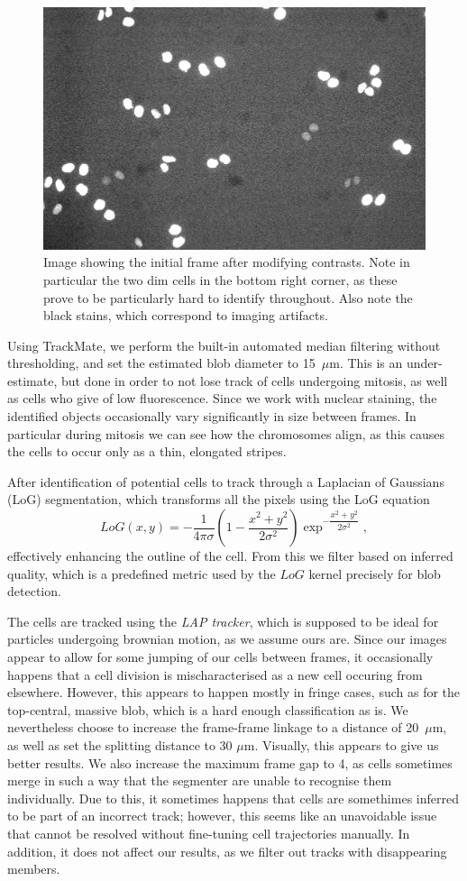 \documentclass[10pt]{article}
\theoremstyle{plain}
\begin{document}
\begin{multicols*}{2}
\begin{multicols}{2}
\begin{figure}[H]
  \centering
  \includegraphics[width=.5\textwidth]{../figures/contrast.png}
  \caption{Image showing the initial frame after modifying contrasts. Note in particular the two dim cells in the bottom right corner, as these prove to be particularly hard to identify throughout. Also note the black stains, which correspond to imaging artifacts.}
  \label{fig:contrasts}
\end{figure}

Using TrackMate, we perform the built-in automated median filtering without thresholding, and set the estimated blob diameter to 15~$\mu$m. This is an under-estimate, but done in order to not lose track of cells undergoing mitosis, as well as cells who give of low fluorescence. Since we work with nuclear staining, the identified objects occasionally vary significantly in size between frames. In particular during mitosis we can see how the chromosomes align, as this causes the cells to occur only as a thin, elongated stripes. 

After identification of potential cells to track through a Laplacian of Gaussians (LoG) segmentation, which transforms all the pixels using the LoG equation $$LoG(x,y) = - \dfrac{1}{4\pi\sigma}\left(1 - \dfrac{x^2 + y^2}{2\sigma^2}\right)\exp^{-\dfrac{x^2 + y^2}{2\sigma^2}},$$ effectively enhancing the outline of the cell. From this we filter based on inferred quality, which is a predefined metric used by the $LoG$ kernel precisely for blob detection.  

The cells are tracked using the \textit{LAP tracker}, which is supposed to be ideal for particles undergoing brownian motion, as we assume ours are. Since our images appear to allow for some jumping of our cells between frames, it occasionally happens that a cell division is mischaracterised as a new cell occuring from elsewhere. However, this appears to happen mostly in fringe cases, such as for the top-central, massive blob, which is a hard enough classification as is. We nevertheless choose to increase the frame-frame linkage to a distance of 20~$\mu$m, as well as set the splitting distance to 30 $\mu$m. Visually, this appears to give us better results. We also increase the maximum frame gap to 4, as cells sometimes merge in such a way that the segmenter are unable to recognise them individually. Due to this, it sometimes happens that cells are somethimes inferred to be part of an incorrect track; however, this seems like an unavoidable issue that cannot be resolved without fine-tuning cell trajectories manually. In addition, it does not affect our results, as we filter out tracks with disappearing members. 


\end{multicols}
\end{multicols*}
\end{document}

